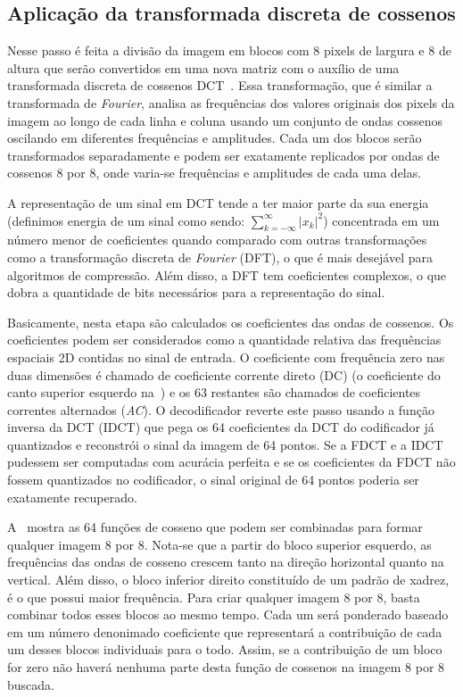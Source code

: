 \subsection{Aplicação da transformada discreta de cossenos}
Nesse passo é feita a divisão da imagem em blocos com 8 pixels de largura e 8 de altura que serão convertidos em uma nova matriz com o auxílio de uma transformada discreta de cossenos \acrshort{DCT}~\cite{ahmed1974discrete}. Essa transformação, que é similar a transformada de \textit{Fourier}, analisa as frequências dos valores originais dos pixels da imagem ao longo de cada linha e coluna usando um conjunto de ondas cossenos oscilando em diferentes frequências e amplitudes. Cada um dos blocos serão transformados separadamente e podem ser exatamente replicados por ondas de cossenos 8 por 8, onde varia-se frequências e amplitudes de cada uma delas. 

A representação de um sinal em \acrshort{DCT} tende a ter maior parte da sua energia (definimos energia de um sinal como sendo: $\sum_{k = - \infty}^{\infty}{|x_k|}^2$) concentrada em um número menor de coeficientes quando comparado com outras transformações como a transformação discreta de \textit{Fourier} (\acrshort{DFT}), o que é mais desejável para algoritmos de compressão. Além disso, a \acrshort{DFT} tem coeficientes complexos, o que dobra a quantidade de bits necessários para a representação do sinal. 

Basicamente, nesta etapa são calculados os coeficientes das ondas de cossenos. Os coeficientes podem ser considerados como a quantidade relativa das frequências espaciais 2D contidas no sinal de entrada. O coeficiente com frequência zero nas duas dimensões é chamado de coeficiente corrente direto (\acrshort{DC}) (o coeficiente do canto superior esquerdo na~) e os 63 restantes são chamados de coeficientes correntes alternados (\textit{AC}). O decodificador reverte este passo usando a função inversa da \acrshort{DCT} (\acrshort{IDCT}) que pega os 64 coeficientes da \acrshort{DCT} do codificador já quantizados e reconstrói o sinal da imagem de 64 pontos. Se a \acrshort{FDCT} e a \acrshort{IDCT} pudessem ser computadas com acurácia perfeita e se os coeficientes da \acrshort{FDCT} não fossem quantizados no codificador, o sinal original de 64 pontos poderia ser exatamente recuperado.

A~ mostra as 64 funções de cosseno que podem ser combinadas para formar qualquer imagem 8 por 8. Nota-se que a partir do bloco superior esquerdo, as frequências das ondas de cosseno crescem tanto na direção horizontal quanto na vertical. Além disso, o bloco inferior direito constituído de um padrão de xadrez, é o que possui maior frequência. Para criar qualquer imagem 8 por 8, basta combinar todos esses blocos ao mesmo tempo. Cada um será ponderado baseado em um número denonimado coeficiente que representará a contribuição de cada um desses blocos individuais para o todo. Assim, se a contribuição de um bloco for zero não haverá nenhuma parte desta função de cossenos na imagem 8 por 8 buscada.

